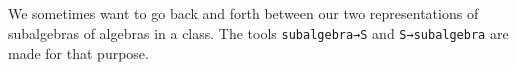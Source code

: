 \begin{code}
\AgdaSpace{}%
\AgdaSymbol{(}\AgdaSymbol{\{}\AgdaSymbol{\}}\AgdaSpace{}%
\AgdaSymbol{)}\AgdaSpace{}%
\AgdaSymbol{=}\AgdaSpace{}%
\AgdaSymbol{\{}\AgdaSymbol{\}\{}\AgdaSymbol{\}\{}\AgdaSymbol{\}}\AgdaSpace{}%
\AgdaSymbol{(}\AgdaSymbol{\{}\AgdaSymbol{\}\{}\AgdaSymbol{\}}\AgdaSpace{}%
\AgdaSpace{}%
\AgdaSymbol{)}\<%
\\
\>[0]\AgdaSpace{}%
\AgdaSpace{}%
\AgdaSymbol{(}\AgdaSymbol{\{}\AgdaSymbol{\}\{}\AgdaSymbol{\}}\AgdaSpace{}%
\AgdaSpace{}%
\AgdaSymbol{)}\AgdaSpace{}%
\AgdaSymbol{=}\AgdaSpace{}%
\AgdaSpace{}%
\AgdaSymbol{(}\AgdaSpace{}%
\AgdaSpace{}%
\AgdaSymbol{)}\AgdaSpace{}%
\<%
\\
\>[0]\AgdaSpace{}%
\AgdaSpace{}%
\AgdaSymbol{(}\AgdaSymbol{\{}\AgdaSymbol{\}\{}\AgdaSymbol{\}}\AgdaSpace{}%
\AgdaSpace{}%
\AgdaSymbol{)}\AgdaSpace{}%
\AgdaSymbol{=}\AgdaSpace{}%
\AgdaSpace{}%
\AgdaSymbol{(}\AgdaSpace{}%
\AgdaSpace{}%
\AgdaSymbol{)}\AgdaSpace{}%
\<%
\\
\>[0]\AgdaSpace{}%
\AgdaSpace{}%
\AgdaSymbol{(}\AgdaSpace{}%
\AgdaSpace{}%
\AgdaSymbol{)}\AgdaSpace{}%
\AgdaSymbol{=}\AgdaSpace{}%
\AgdaSpace{}%
\AgdaSymbol{(}\AgdaSpace{}%
\AgdaSpace{}%
\AgdaSymbol{)}\AgdaSpace{}%
\<%
\\
\>[0]\<%
\end{code}

We sometimes want to go back and forth between our two representations
of subalgebras of algebras in a class. The tools \texttt{subalgebra→S}
and \texttt{S→subalgebra} are made for that purpose.

